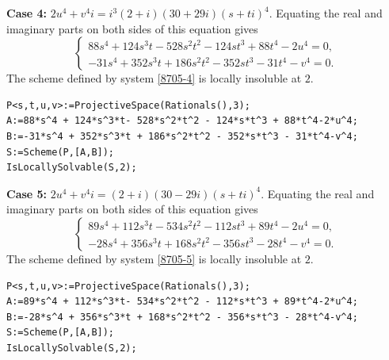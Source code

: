 \documentclass[a4paper,12pt,english,reqno]{amsart}
\begin{document}
{\bf Case 4:} $2u^4+v^4i=i^3(2+i)(30+29i)(s+ti)^4$. Equating the real and imaginary parts on both sides of this equation gives
\begin{equation}\label{8705-4}
\begin{cases}
88s^4 + 124s^3t - 528s^2t^2 - 124st^3 + 88t^4 - 2u^4=0,\\
-31s^4 + 352s^3t + 186s^2t^2 - 352st^3 - 31t^4 - v^4=0.
\end{cases}
\end{equation}
The scheme defined by system \eqref{8705-4} is locally insoluble at $2$.

\begin{lstlisting}
P<s,t,u,v>:=ProjectiveSpace(Rationals(),3);
A:=88*s^4 + 124*s^3*t- 528*s^2*t^2 - 124*s*t^3 + 88*t^4-2*u^4;
B:=-31*s^4 + 352*s^3*t + 186*s^2*t^2 - 352*s*t^3 - 31*t^4-v^4;
S:=Scheme(P,[A,B]);
IsLocallySolvable(S,2);
\end{lstlisting}



{\bf Case 5:} $2u^4+v^4i=(2+i)(30-29i)(s+ti)^4$. Equating the real and imaginary parts on both sides of this equation gives
\begin{equation}\label{8705-5}
\begin{cases}
89s^4 + 112s^3t - 534s^2t^2 - 112st^3 + 89t^4 - 2u^4=0,\\
-28s^4 + 356s^3t + 168s^2t^2 - 356st^3 - 28t^4 - v^4=0.
\end{cases}
\end{equation}
The scheme defined by system \eqref{8705-5} is locally insoluble at $2$.

\begin{lstlisting}
P<s,t,u,v>:=ProjectiveSpace(Rationals(),3);
A:=89*s^4 + 112*s^3*t- 534*s^2*t^2 - 112*s*t^3 + 89*t^4-2*u^4;
B:=-28*s^4 + 356*s^3*t + 168*s^2*t^2 - 356*s*t^3 - 28*t^4-v^4;
S:=Scheme(P,[A,B]);
IsLocallySolvable(S,2);
\end{lstlisting}
\end{document}

